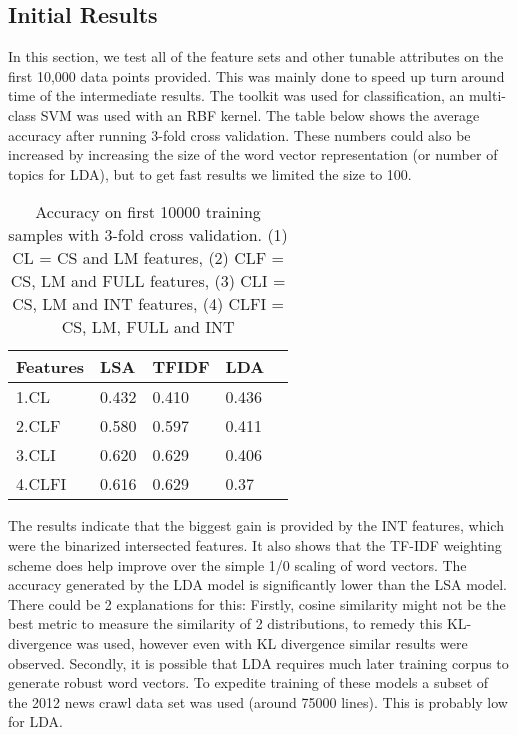 \documentclass[11pt]{article}
\begin{document}
\subsection{Initial Results}
In this section, we test all of the feature sets and other tunable attributes on
the first 10,000 data points provided. This was mainly done to speed up turn
around time of the intermediate results. The \cite{scikit-learn} toolkit was
used for classification, an multi-class SVM was used with an RBF kernel. The table below
shows the average accuracy after running 3-fold cross validation. These numbers could also be increased by increasing the size of the word vector representation (or number
of topics for LDA), but to get fast results we limited the size to 100.
\begin{table}[h]
\begin{center}
\begin{singlespace}
\begin{tabular}{|l|l|l|l|l|}
\hline \bf Features & \bf LSA & \bf TFIDF  & \bf LDA \\ \hline
1.CL &0.432& 0.410 & 0.436\\
2.CLF &0.580 & 0.597&0.411\\
3.CLI & 0.620 & 0.629&0.406\\
4.CLFI&0.616& 0.629&0.37 \\
\hline
\end{tabular}
\end{singlespace}
\end{center}
\caption{ Accuracy on first 10000 training samples with 3-fold cross validation.
  (1) CL = CS and LM features, 
  (2) CLF = CS, LM and FULL features,
  (3) CLI = CS, LM and INT features,
  (4) CLFI = CS, LM, FULL and INT}
\end{table}
The results indicate that the biggest gain is provided by the INT features,
which were the binarized intersected features. It also shows that the TF-IDF
weighting scheme does help improve over the simple 1/0 scaling of word vectors.
The accuracy generated by the LDA model is significantly lower than the LSA
model. There could be 2 explanations for this: Firstly, cosine similarity might
not be the best metric to measure the similarity of 2 distributions, to remedy this
KL-divergence was used, however even with KL divergence similar results were
observed. Secondly, it is possible that LDA requires much later training corpus
to generate robust word vectors. To expedite training of these models a subset
of the 2012 news crawl data set was used (around 75000 lines). This is probably
low for LDA.

{} 
\end{document}
